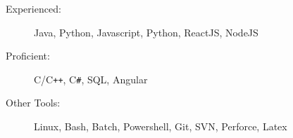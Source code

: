 

\begin{description}
\item[Experienced:]
Java, Python, Javascript, Python, ReactJS, NodeJS
\item[Proficient:]
C/C{}\verb!++!, C{}\verb!#!, SQL, Angular
\item[Other Tools:]
Linux, Bash, Batch, Powershell, Git, SVN, Perforce, Latex
\end{description}
